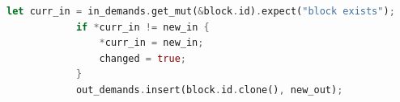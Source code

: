 \begin{lstlisting}[language=Rust, caption={Codata Thunk Analysis and Stream Fusion (\texttt{src/mir/thunk\_analysis.rs}).}, label={lst:thunk_impl}]
            let curr_in = in_demands.get_mut(&block.id).expect("block exists");
            if *curr_in != new_in {
                *curr_in = new_in;
                changed = true;
            }
            out_demands.insert(block.id.clone(), new_out);

\end{lstlisting}
